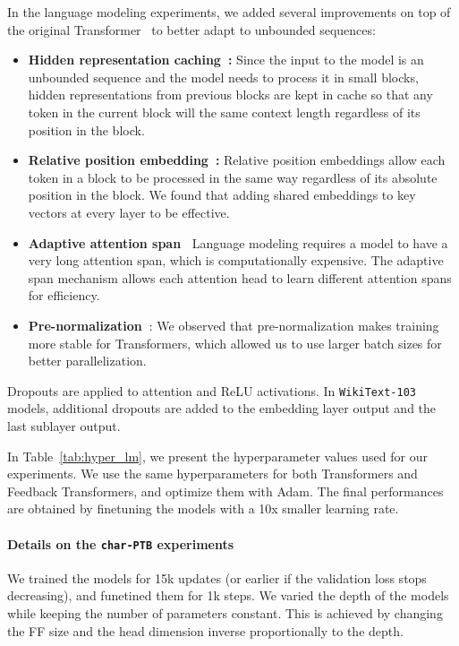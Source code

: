 \documentclass{article} \usepackage{iclr2021_conference}
\begin{document}
In the language modeling experiments, we added several improvements on top of the original Transformer~\cite{vaswani2017attention} to better adapt to unbounded sequences:
\begin{itemize}
    \setlength\itemsep{-0.3em}
  \item \textbf{Hidden representation caching~\cite{dai2019transformer}:} Since the input to the model is an unbounded sequence and the model needs to process it in small blocks, hidden representations from previous blocks are kept in cache so that any token in the current block will the same context length regardless of its position in the block.
  \item \textbf{Relative position embedding~\cite{shaw2018self}:} Relative position embeddings allow each token in a block to be processed in the same way regardless of its absolute position in the block. We found that adding shared embeddings to key vectors at every layer to be effective.
  \item \textbf{Adaptive attention span~\cite{sukhbaatar2019adaptive}}
  Language modeling requires a model to have a very long attention span, which is computationally expensive. The adaptive span mechanism allows each attention head to learn different attention spans for efficiency.
  \item \textbf{Pre-normalization~\cite{child2019generating}}: We observed that pre-normalization makes training more stable for Transformers, which allowed us to use larger batch sizes for better parallelization.
\end{itemize}

Dropouts are applied to attention and ReLU activations. In \texttt{WikiText-103} models, additional dropouts are added to the embedding layer output and the last sublayer output.

In Table~\ref{tab:hyper_lm}, we present the hyperparameter values used for our experiments. We use the same hyperparameters for both Transformers and Feedback Transformers, and optimize them with Adam.
The final performances are obtained by finetuning the models with a 10x smaller learning rate.

\paragraph{Details on the \texttt{char-PTB} experiments}
We trained the models for 15k updates (or earlier if the validation loss stops decreasing), and funetined them for 1k steps.
We varied the depth of the models while keeping the number of parameters constant. This is achieved by changing the FF size and the head dimension inverse proportionally to the depth.
\end{document}
